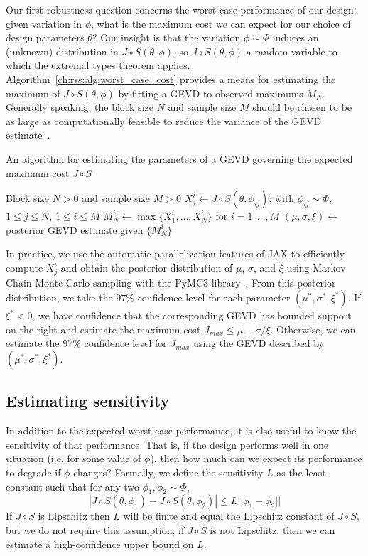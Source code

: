 Our first robustness question concerns the worst-case performance of our design: given variation in $\phi$, what is the maximum cost we can expect for our choice of design parameters $\theta$? Our insight is that the variation $\phi \sim \Phi$ induces an (unknown) distribution in $J \circ S (\theta, \phi)$, so $J \circ S (\theta, \phi)$ a random variable to which the extremal types theorem applies. Algorithm~\ref{ch:rss:alg:worst_case_cost} provides a means for estimating the maximum of $J \circ S (\theta, \phi)$ by fitting a GEVD to observed maximums $M_N$. Generally speaking, the block size $N$ and sample size $M$ should be chosen to be as large as computationally feasible to reduce the variance of the GEVD estimate~\cite{coles_2001}.

\begin{algorithm}
	\caption{An algorithm for estimating the parameters of a GEVD governing the expected maximum cost $J \circ S$}\label{ch:rss:alg:worst_case_cost}
	\begin{algorithmic}
		\Require Block size $N > 0$ and sample size $M > 0$
		\State $X_j^i \gets J\circ S(\theta, \phi_{ij})$; with $\phi_{ij}\sim\Phi$, $1\leq j\leq N$, $1\leq i\leq M$
		\State $M_N^i \gets \max\{X_1^i, \ldots, X_N^i\}$ for $i=1,\ldots,M$
		\State $(\mu, \sigma, \xi) \gets$ posterior GEVD estimate given $\{M_N^i\}$
	\end{algorithmic}
\end{algorithm}

In practice, we use the automatic parallelization features of JAX to efficiently compute $X_j^i$ and obtain the posterior distribution of $\mu$, $\sigma$, and $\xi$ using Markov Chain Monte Carlo sampling with the PyMC3 library~\cite{salvatier_wiecki_fonnesbeck_2016}. From this posterior distribution, we take the $97\%$ confidence level for each parameter $(\mu^*, \sigma^*, \xi^*)$. If $\xi^* < 0$, we have confidence that the corresponding GEVD has bounded support on the right and estimate the maximum cost $J_{max} \leq \mu - \sigma/\xi$. Otherwise, we can estimate the 97\% confidence level for $J_{max}$ using the GEVD described by $(\mu^*, \sigma^*, \xi^*)$.

\subsection{Estimating sensitivity}

In addition to the expected worst-case performance, it is also useful to know the sensitivity of that performance. That is, if the design performs well in one situation (i.e. for some value of $\phi$), then how much can we expect its performance to degrade if $\phi$ changes? Formally, we define the sensitivity $L$ as the least constant such that for any two $\phi_1, \phi_2 \sim \Phi$, $$|J\circ S(\theta, \phi_1) - J\circ S(\theta, \phi_2)| \leq L ||\phi_1 - \phi_2||$$
If $J \circ S$ is Lipschitz then $L$ will be finite and equal the Lipschitz constant of $J \circ S$, but we do not require this assumption; if $J \circ S$ is not Lipschitz, then we can estimate a high-confidence upper bound on $L$.

